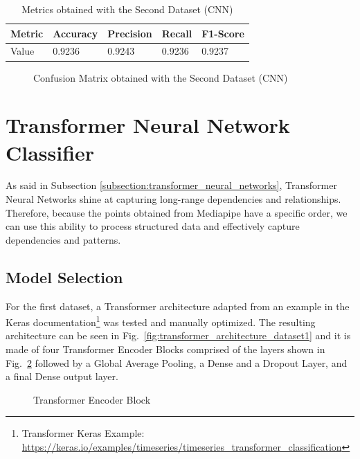\begin{table}[H]
    \centering
    \caption{Metrics obtained with the Second Dataset (CNN)}
    \label{table:cnn_dataset2_results}
    \begin{tabular}{|l|l|l|l|l|}
        \hline
        Metric & Accuracy & Precision & Recall & F1-Score \\
        \hline
        Value & 0.9236 & 0.9243 & 0.9236 & 0.9237 \\
        \hline
    \end{tabular}
\end{table}

\begin{figure}[H]
    \centering
    {\fontsize{10}{12}\selectfont}
    \caption[Confusion Matrix obtained with the Second Dataset (CNN)]{Confusion Matrix obtained with the Second Dataset (CNN)}
    \label{fig:cnn_dataset2_confusion_matrix}
\end{figure}

\section{Transformer Neural Network Classifier}

As said in Subsection \ref{subsection:transformer_neural_networks}, Transformer Neural Networks shine at capturing long-range dependencies and relationships. Therefore, because the points obtained from Mediapipe have a specific order, we can use this ability to process structured data and effectively capture dependencies and patterns.

\subsection{Model Selection}

For the first dataset, a Transformer architecture adapted from an example in the Keras documentation\footnote{Transformer Keras Example: \url{https://keras.io/examples/timeseries/timeseries_transformer_classification}} was tested and manually optimized. The resulting architecture can be seen in Fig.~\ref{fig:transformer_architecture_dataset1} and it is made of four Transformer Encoder Blocks comprised of the layers shown in Fig.~\ref{fig:transformer_encoder_architecture} followed by a Global Average Pooling, a Dense and a Dropout Layer, and a final Dense output layer.

\begin{figure}[H]
    \centering
    {\fontsize{10}{12}\selectfont}
    \caption[Transformer Encoder Block]{Transformer Encoder Block}
    \label{fig:transformer_encoder_architecture}
\end{figure}

